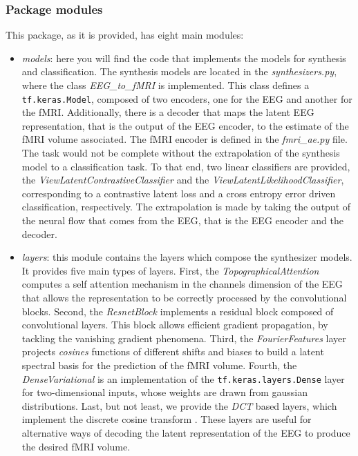 \subsubsection{Package modules}\label{section:modules}

This package, as it is provided, has eight main modules:
\begin{itemize}
    \item \textit{models}: here you will find the code that implements the models for synthesis and classification. The synthesis models are located in the \textit{synthesizers.py}, where the class \textit{EEG\_to\_fMRI} is implemented. This class defines a \texttt{tf.keras.Model}, composed of two encoders, one for the EEG and another for the fMRI. Additionally, there is a decoder that maps the latent EEG representation, that is the output of the EEG encoder, to the estimate of the fMRI volume associated. The fMRI encoder is defined in the \textit{fmri\_ae.py} file. The task would not be complete without the extrapolation of the synthesis model to a classification task. To that end, two linear classifiers are provided, the \textit{ViewLatentContrastiveClassifier} and the \textit{ViewLatentLikelihoodClassifier}, corresponding to a contrastive latent loss and a cross entropy error driven classification, respectively. The extrapolation is made by taking the output of the neural flow that comes from the EEG, that is the EEG encoder and the decoder.
    \item \textit{layers}: this module contains the layers which compose the synthesizer models. It provides five main types of layers. First, the \textit{TopographicalAttention} computes a self attention mechanism in the channels dimension of the EEG \citep{calhas2022eeg} that allows the representation to be correctly processed by the convolutional blocks. Second, the \textit{ResnetBlock} \citep{he2016deep} implements a residual block composed of convolutional layers. This block allows efficient gradient propagation, by tackling the vanishing gradient phenomena. Third, the \textit{FourierFeatures} layer projects \textit{cosines} functions of different shifts and biases to build a latent spectral basis for the prediction of the fMRI volume. Fourth, the \textit{DenseVariational} is an implementation of the \texttt{tf.keras.layers.Dense} layer for two-dimensional inputs, whose weights are drawn from gaussian distributions. Last, but not least, we provide the \textit{DCT} based layers, which implement the discrete cosine transform \citep{ahmed1974discrete}. These layers are useful for alternative ways of decoding the latent representation of the EEG to produce the desired fMRI volume.

\end{itemize}
